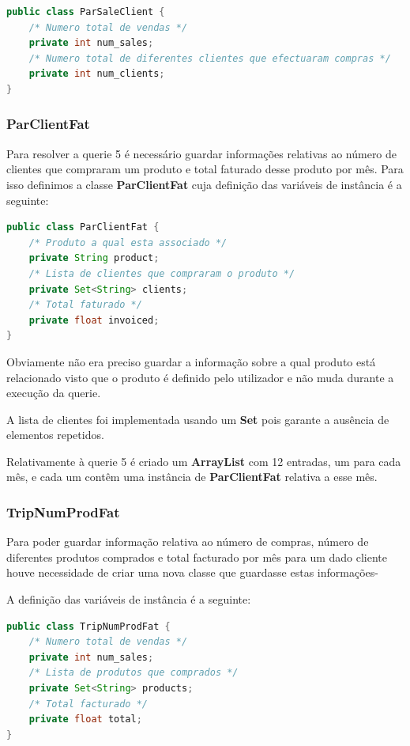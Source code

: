 \documentclass[10pt] {article}
\begin{document}
\begin{lstlisting}[language=Java]
public class ParSaleClient {
	/* Numero total de vendas */
	private int num_sales;
	/* Numero total de diferentes clientes que efectuaram compras */
	private int num_clients;
}
\end{lstlisting}

\subsubsection{ParClientFat}
\par Para resolver a querie 5 é necessário guardar informações relativas ao número de clientes que compraram um produto
e total faturado desse produto por mês. Para isso definimos a classe \textbf{ParClientFat} cuja definição das variáveis de
instância é a seguinte:

\begin{lstlisting}[language=Java]
public class ParClientFat {
	/* Produto a qual esta associado */
	private String product;
	/* Lista de clientes que compraram o produto */
	private Set<String> clients;
	/* Total faturado */
	private float invoiced;
}
\end{lstlisting}

\par Obviamente não era preciso guardar a informação sobre a qual produto está relacionado visto que o produto é definido
pelo utilizador e não muda durante a execução da querie.
\par A lista de clientes foi implementada usando um \textbf{Set} pois garante a ausência de elementos repetidos.
\par Relativamente à querie 5 é criado um \textbf{ArrayList} com 12 entradas, um para cada mês, e cada um contêm uma
instância de \textbf{ParClientFat} relativa a esse mês.

\subsubsection{TripNumProdFat}
\par Para poder guardar informação relativa ao número de compras, número de diferentes produtos comprados e total
facturado por mês para um dado cliente houve necessidade de criar uma nova classe que guardasse estas informações-
\par A definição das variáveis de instância é a seguinte:

\begin{lstlisting}[language=Java]
public class TripNumProdFat {
	/* Numero total de vendas */
	private int num_sales;
	/* Lista de produtos que comprados */
	private Set<String> products;
	/* Total facturado */
	private float total;
}
\end{lstlisting}
\end{document}
